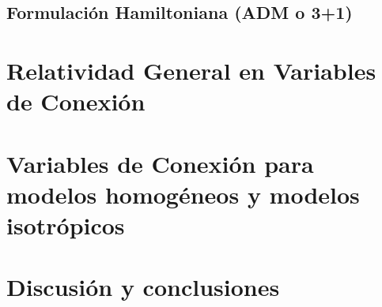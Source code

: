 \documentclass[11pt, letterpaper, spanish]{book}
\theoremstyle{definition}
\theoremstyle{plain}
\theoremstyle{remark}
\theoremstyle{break}
\begin{document}

\section{Formulaci\'{o}n Hamiltoniana (ADM o 3+1)}
\label{chp:ADM}









\chapter{Relatividad General en Variables de Conexi\'{o}n}






\chapter{Variables de Conexi\'{o}n para modelos homog\'{e}neos y modelos isotr\'{o}picos}
\label{chp:SymmetryReduction}





\chapter{Discusi\'{o}n y conclusiones}



\end{document}
